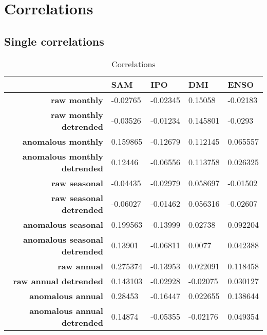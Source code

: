 \section{Correlations}

\subsection{Single correlations}
\begin{table}[H]
	\begin{tabular}{rllll}
		\hline
		& \textbf{SAM} & \textbf{IPO} & \textbf{DMI} & \textbf{ENSO} \\ \hline
		\textbf{raw monthly}                  & -0.02765     & -0.02345     & 0.15058      & -0.02183      \\
		\textbf{raw monthly detrended}        & -0.03526     & -0.01234     & 0.145801     & -0.0293       \\
		\textbf{anomalous monthly}            & 0.159865     & -0.12679     & 0.112145     & 0.065557      \\
		\textbf{anomalous monthly detrended}  & 0.12446      & -0.06556     & 0.113758     & 0.026325      \\
		\textbf{raw seasonal}                 & -0.04435     & -0.02979     & 0.058697     & -0.01502      \\
		\textbf{raw seasonal detrended}       & -0.06027     & -0.01462     & 0.056316     & -0.02607      \\
		\textbf{anomalous seasonal}           & 0.199563     & -0.13999     & 0.02738      & 0.092204      \\
		\textbf{anomalous seasonal detrended} & 0.13901      & -0.06811     & 0.0077       & 0.042388      \\
		\textbf{raw annual}                   & 0.275374     & -0.13953     & 0.022091     & 0.118458      \\
		\textbf{raw annual detrended}         & 0.143103     & -0.02928     & -0.02075     & 0.030127      \\
		\textbf{anomalous annual}             & 0.28453      & -0.16447     & 0.022655     & 0.138644      \\
		\textbf{anomalous annual detrended}   & 0.14874      & -0.05355     & -0.02176     & 0.049354      \\ \hline
	\end{tabular}
\caption{Correlations}
\end{table}


